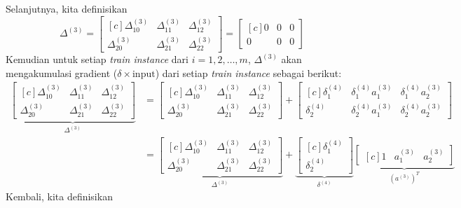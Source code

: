 \documentclass[12pt]{article}
\begin{document}
Selanjutnya, kita definisikan 
\begin{equation}
	\Delta^{(3)} = \begin{bmatrix}[c]
		\Delta_{10}^{(3)} & \Delta_{11}^{(3)} & \Delta_{12}^{(3)} \\
		\Delta_{20}^{(3)} & \Delta_{21}^{(3)} & \Delta_{22}^{(3)}		
	\end{bmatrix} = \begin{bmatrix}[c]
		0 & 0 & 0 \\
		0 & 0 & 0		
	\end{bmatrix}
\end{equation}
Kemudian untuk setiap \textit{train instance} dari $i = 1, 2, \ldots, m$, $\Delta^{(3)}$ akan mengakumulasi gradient ($\delta \times \text{input}$) dari setiap \textit{train instance}  sebagai berikut:
\begin{align}
\underbrace{\begin{bmatrix}[c]
		\Delta_{10}^{(3)} & \Delta_{11}^{(3)} & \Delta_{12}^{(3)} \\
		\Delta_{20}^{(3)} & \Delta_{21}^{(3)} & \Delta_{22}^{(3)}		
	\end{bmatrix}}_{\Delta^{(3)}} &= \begin{bmatrix}[c]
		\Delta_{10}^{(3)} & \Delta_{11}^{(3)} & \Delta_{12}^{(3)} \\
		\Delta_{20}^{(3)} & \Delta_{21}^{(3)} & \Delta_{22}^{(3)}		
	\end{bmatrix} + \begin{bmatrix}[c]
		\delta_1^{(4)} & \delta_1^{(4)} a_1^{(3)} & \delta_1^{(4)} a_2^{(3)} \\
		\delta_2^{(4)} & \delta_2^{(4)} a_1^{(3)} & \delta_2^{(4)} a_2^{(3)}
	\end{bmatrix}	\\
	              &= \underbrace{\begin{bmatrix}[c]
		\Delta_{10}^{(3)} & \Delta_{11}^{(3)} & \Delta_{12}^{(3)} \\
		\Delta_{20}^{(3)} & \Delta_{21}^{(3)} & \Delta_{22}^{(3)}		
	\end{bmatrix}}_{\Delta^{(3)}} + \underbrace{\begin{bmatrix}[c]
		\delta_1^{(4)} \\
		\delta_2^{(4)}
	\end{bmatrix}}_{\delta^{(4)}}  \underbrace{\begin{bmatrix}[c]
		1 & a_1^{(3)} & a_2^{(3)}
	\end{bmatrix}}_{(a^{(3)})^T} 
\end{align}
Kembali, kita definisikan 
\end{document}
